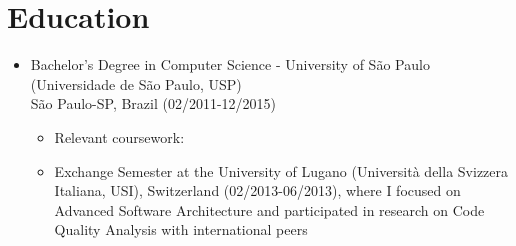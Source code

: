 
\section{Education}
\begin{itemize}
    \item \small{Bachelor's Degree in Computer Science - University of São Paulo (Universidade de São Paulo, USP)}\\
          \footnotesize{São Paulo-SP, Brazil (02/2011-12/2015)}
          \begin{itemize}[itemsep=1pt, parsep=0pt]
              \item \footnotesize{Relevant coursework: \RelevantCoursework}
              \item \footnotesize{Exchange Semester at the University of Lugano (Università della Svizzera Italiana, USI), Switzerland (02/2013-06/2013), where I focused on Advanced Software Architecture and participated in research on Code Quality Analysis with international peers}
          \end{itemize}
\end{itemize}